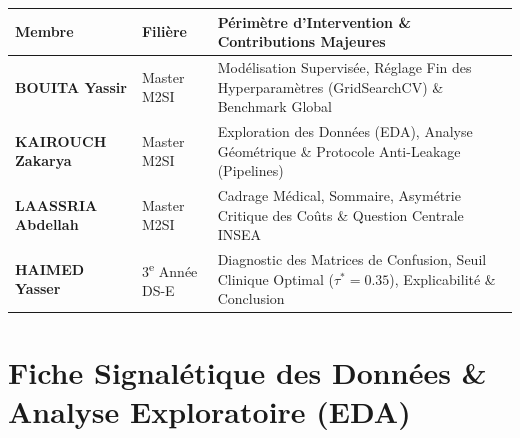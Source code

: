 \documentclass[10pt,a4paper]{article}
\begin{document}
\noindent
\begin{tcolorbox}[greenbox, title={Composition de l'Équipe Projet \& Répartition des Responsabilités}]
\small
\begin{tabularx}{\textwidth}{l l X}
	\textbf{Membre} & \textbf{Filière} & \textbf{Périmètre d'Intervention \& Contributions Majeures} \\
	\midrule
	\textbf{BOUITA Yassir} & Master M2SI & Modélisation Supervisée, Réglage Fin des Hyperparamètres (GridSearchCV) \& Benchmark Global \\
	\textbf{KAIROUCH Zakarya} & Master M2SI & Exploration des Données (EDA), Analyse Géométrique \& Protocole Anti-Leakage (Pipelines) \\
	\textbf{LAASSRIA Abdellah} & Master M2SI & Cadrage Médical, Sommaire, Asymétrie Critique des Coûts \& Question Centrale INSEA \\
	\textbf{HAIMED Yasser} & 3\textsuperscript{e} Année DS-E & Diagnostic des Matrices de Confusion, Seuil Clinique Optimal ($\tau^*=0.35$), Explicabilité \& Conclusion \\
\end{tabularx}
\end{tcolorbox}

\section{Fiche Signalétique des Données \& Analyse Exploratoire (EDA)}
\end{document}
